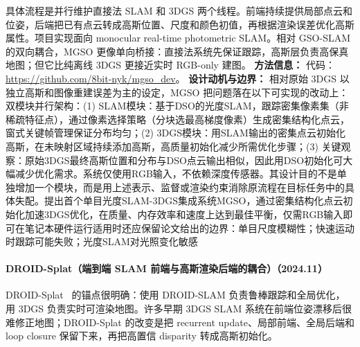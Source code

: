 具体流程是并行维护直接法 SLAM 和 3DGS 两个线程。前端持续提供局部点云和位姿，后端把已有点云转成高斯位置、尺度和颜色初值，再根据渲染误差优化高斯属性。项目实现面向 monocular real-time photometric SLAM。相对 GSO-SLAM 的双向耦合，MGSO 更像单向桥接：直接法系统先保证跟踪，高斯层负责高保真地图；但它比纯离线 3DGS 更接近实时 RGB-only 建图。
\textbf{方法信息：} 代码：\url{https://github.com/8bit-nyk/mgso_dev}。
\textbf{设计动机与边界：} 相对原始 3DGS 以独立高斯和图像重建误差为主的设定，MGSO 把问题落在以下可实现的改动上：双模块并行架构：(1) SLAM模块：基于DSO的光度SLAM，跟踪密集像素集（非稀疏特征点），通过像素选择策略（分块选最高梯度像素）生成密集结构化点云，窗式关键帧管理保证分布均匀；(2) 3DGS模块：用SLAM输出的密集点云初始化高斯，在未映射区域持续添加高斯，高质量初始化减少所需优化步骤；(3) 关键观察：原始3DGS最终高斯位置和分布与DSO点云输出相似，因此用DSO初始化可大幅减少优化需求。系统仅使用RGB输入，不依赖深度传感器。其设计目的不是单独增加一个模块，而是用上述表示、监督或渲染约束消除原流程在目标任务中的具体失配。提出首个单目光度SLAM-3DGS集成系统MGSO，通过密集结构化点云初始化加速3DGS优化，在质量、内存效率和速度上达到最佳平衡，仅需RGB输入即可在笔记本硬件运行适用时还应保留论文给出的边界：单目尺度模糊性；快速运动时跟踪可能失败；光度SLAM对光照变化敏感
\paragraph{DROID-Splat（端到端 SLAM 前端与高斯渲染后端的耦合）（2024.11）}
DROID-Splat~\cite{2411_17660} 的锚点很明确：使用 DROID-SLAM 负责鲁棒跟踪和全局优化，用 3DGS 负责实时可渲染地图。许多早期 3DGS SLAM 系统在前端位姿漂移后很难修正地图；DROID-Splat 的改变是把 recurrent update、局部前端、全局后端和 loop closure 保留下来，再把高置信 disparity 转成高斯初始化。

